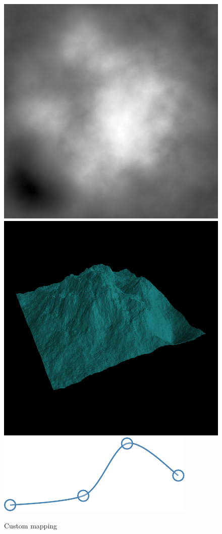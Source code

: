 	\begin{figure}[H]
		\centering
		\includegraphics[width=\imagewidth]{images/results/terrains/512-1/blending/custom}
		\includegraphics[width=\imagewidth]{images/results/terrains/512-1/blending/custom_3d}
		\\[0.5em]
		\includegraphics[]{images/results/terrains/512-1/blending/custom_spline.pdf}
		\caption{Custom mapping}
		\label{fig:ex-custom-surface}
	\end{figure}
  
